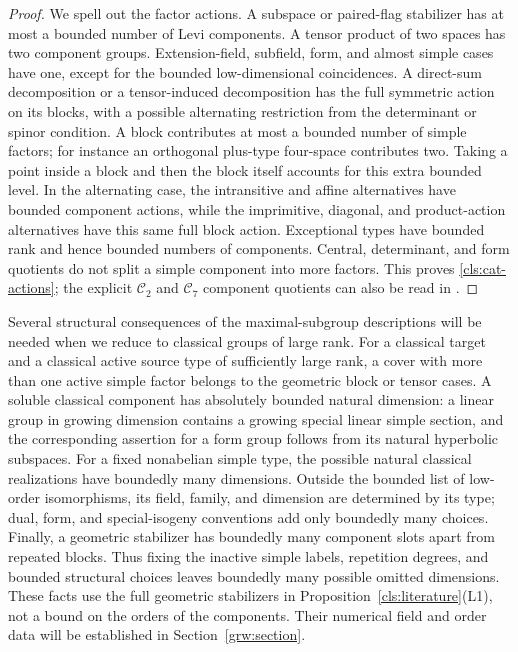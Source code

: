 \begin{proof}
We spell out the factor actions.  A subspace or paired-flag
stabilizer has at most a bounded number of Levi components.  A tensor
product of two spaces has two component groups.  Extension-field,
subfield, form, and almost simple cases have one, except for the
bounded low-dimensional coincidences.  A direct-sum decomposition or
a tensor-induced decomposition has the full symmetric action on its
blocks, with a possible alternating restriction from the determinant
or spinor condition.  A block contributes at most a bounded number of
simple factors; for instance an orthogonal plus-type four-space
contributes two.  Taking a point inside a block and then the block
itself accounts for this extra bounded level.  In the alternating
case, the intransitive and affine alternatives have bounded component
actions, while the imprimitive, diagonal, and product-action
alternatives have this same full block action.  Exceptional types have
bounded rank and hence bounded numbers of components.  Central,
determinant, and form quotients do not split a simple component into
more factors.  This proves \ref{cls:cat-actions}; the explicit
$\mathcal C_2$ and $\mathcal C_7$ component quotients can also be read
in \cite[proofs of Lemmas~5.4 and~5.9]{BurnessLiebeckShalev2017}.
\end{proof}

Several structural consequences of the maximal-subgroup descriptions
will be needed when we reduce to classical groups of large rank.
For a classical target and a classical active source type of sufficiently
large rank, a cover with more than one active simple factor belongs to the
geometric block or tensor cases. A soluble classical component has absolutely
bounded natural dimension: a linear group in growing dimension contains
a growing special linear simple section, and the corresponding assertion
for a form group follows from its natural hyperbolic subspaces.
For a fixed nonabelian simple type, the possible natural classical
realizations have boundedly many dimensions. Outside the bounded list
of low-order isomorphisms, its field, family, and dimension are determined
by its type; dual, form, and special-isogeny conventions add only
boundedly many choices. Finally, a geometric stabilizer has boundedly
many component slots apart from repeated blocks. Thus fixing the inactive
simple labels, repetition degrees, and bounded structural choices leaves
boundedly many possible omitted dimensions. These facts use the full
geometric stabilizers in Proposition~\ref{cls:literature}(L1), not a bound
on the orders of the components. Their numerical field and order data
will be established in Section~\ref{grw:section}.


